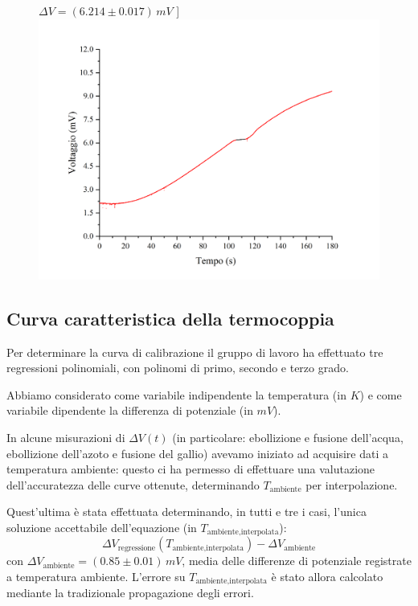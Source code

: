 \documentclass{article}
\begin{document}
\begin{figure}[H]
    $\Delta V=(6.214\pm0.017)\,\unit{mV}$
  ]{\includegraphics[trim={1cm 0.6cm 1cm 1cm},clip,width=.49\textwidth]{img/indio.png}}\hfil
\end{figure}

\pagebreak
\subsection{Curva caratteristica della termocoppia}

Per determinare la curva di calibrazione il gruppo di lavoro ha effettuato
tre regressioni polinomiali, con polinomi di primo, secondo e terzo grado.

Abbiamo considerato come variabile indipendente la temperatura (in $\unit{K}$)
e come variabile dipendente la differenza di potenziale (in $\unit{mV}$).

\vspace{3mm}

In alcune misurazioni di $\Delta V(t)$ (in particolare:
ebollizione e fusione dell'acqua, ebollizione dell'azoto e
fusione del gallio) avevamo iniziato
ad acquisire dati a temperatura ambiente: questo ci ha
permesso di effettuare una valutazione dell'accuratezza
delle curve ottenute, determinando $T_\text{ambiente}$
per interpolazione.

Quest'ultima è stata effettuata determinando, in tutti e tre i casi,
l'unica soluzione accettabile dell'equazione (in $T_\text{ambiente,interpolata}$):
\[
  \Delta V_\text{regressione}(T_\text{ambiente,interpolata})
  - \Delta V_\text{ambiente}
\]
con $\Delta V_\text{ambiente} = (0.85\pm0.01)\,\unit{mV}$,
media delle differenze di potenziale registrate a temperatura
ambiente.
L'errore su $T_\text{ambiente,interpolata}$ è stato allora calcolato
mediante la tradizionale propagazione degli errori.
\end{document}
